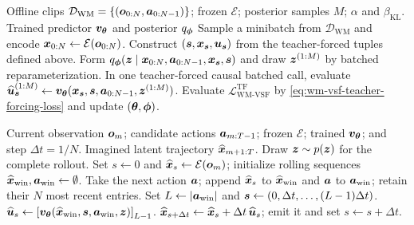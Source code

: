 \medskip
\noindent
\begin{minipage}[t]{0.485\linewidth}
\vspace{0pt}
\begin{algorithm}[H]
\caption{World-model VSF training}
\label{alg:wm-vsf-training}
\begin{vsfalgorithmic}
\VSFInput Offline clips
$\mathcal D_{\mathrm{WM}}=\{({\bm{o}}_{0:N},{\bm{a}}_{0:N-1})\}$; frozen
$\mathcal E$; posterior samples $M$;
$\alpha$ and $\beta_{\mathrm{KL}}$.
\VSFOutput Trained predictor ${\bm{v}}_{{\bm{\theta}}}$ and posterior $q_{\boldsymbol{\phi}}$
  \VSFState Sample a minibatch from $\mathcal D_{\mathrm{WM}}$ and encode
  ${\bm{x}}_{0:N}\gets\mathcal E({\bm{o}}_{0:N})$.
  \VSFState Construct $({\bm{s}},{\bm{x}}_{{\bm{s}}},{\bm{u}}_{{\bm{s}}})$ from the
  teacher-forced tuples defined above.
  \VSFState Form
  $q_{\boldsymbol{\phi}}({\bm{z}}\mid{\bm{x}}_{0:N},{\bm{a}}_{0:N-1},{\bm{x}}_{{\bm{s}}},{\bm{s}})$ and draw
  ${\bm{z}}^{(1:M)}$ by batched reparameterization.
  \VSFState In one teacher-forced causal batched call, evaluate
  $\widehat{{\bm{u}}}_{{\bm{s}}}^{(1:M)}\gets
  {\bm{v}}_{{\bm{\theta}}}({\bm{x}}_{{\bm{s}}},{\bm{s}},{\bm{a}}_{0:N-1},{\bm{z}}^{(1:M)})$.
  \VSFState Evaluate $\mathcal L_{\mathrm{WM\text{-}VSF}}^{\mathrm{TF}}$
  by \eqref{eq:wm-vsf-teacher-forcing-loss} and update $({\bm{\theta}},\boldsymbol{\phi})$.
\VSFEndWhile
\end{vsfalgorithmic}
\end{algorithm}
\end{minipage}\hfill
\begin{minipage}[t]{0.485\linewidth}
\vspace{0pt}
\begin{algorithm}[H]
\caption{World-model VSF inference}
\label{alg:wm-vsf-inference}
\begin{vsfalgorithmic}
\VSFInput Current observation ${\bm{o}}_m$; candidate actions
${\bm{a}}_{m:T-1}$; frozen $\mathcal E$; trained
${\bm{v}}_{{\bm{\theta}}}$; and step $\Delta t=1/N$.
\VSFOutput Imagined latent trajectory $\widehat{{\bm{x}}}_{m+1:T}$.
\VSFState Draw ${\bm{z}}\sim p({\bm{z}})$ for the complete rollout.
\VSFState Set $s\gets0$ and $\widehat{{\bm{x}}}_s\gets\mathcal E({\bm{o}}_m)$;
initialize rolling sequences
$\widehat{{\bm{x}}}_{\mathrm{win}},{\bm{a}}_{\mathrm{win}}\gets\emptyset$.
  \VSFState Take the next action ${\bm{a}}$; append $\widehat{{\bm{x}}}_s$ to
  $\widehat{{\bm{x}}}_{\mathrm{win}}$ and ${\bm{a}}$ to ${\bm{a}}_{\mathrm{win}}$; retain
  their $N$ most recent entries.
  \VSFState Set $L\gets|{\bm{a}}_{\mathrm{win}}|$ and
  ${\bm{s}}\gets(0,\Delta t,\ldots,(L-1)\Delta t)$.
  \VSFState $\widehat{{\bm{u}}}_s\gets\left[
  {\bm{v}}_{{\bm{\theta}}}(\widehat{{\bm{x}}}_{\mathrm{win}},{\bm{s}},
  {\bm{a}}_{\mathrm{win}},{\bm{z}})\right]_{L-1}$.
  \VSFState $\widehat{{\bm{x}}}_{s+\Delta t}\gets
  \widehat{{\bm{x}}}_s+\Delta t\,\widehat{{\bm{u}}}_s$; emit it and set
  $s\gets s+\Delta t$.
\VSFEndWhile
\end{vsfalgorithmic}
\end{algorithm}
\end{minipage}\par



